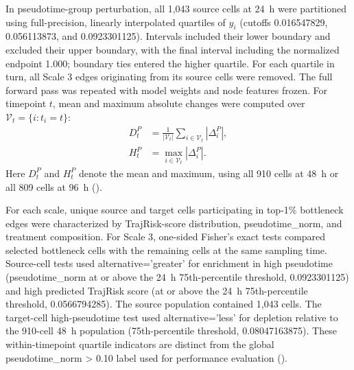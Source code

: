 In pseudotime-group perturbation, all 1,043 source cells at 24~h were partitioned using full-precision, linearly interpolated quartiles of \(y_i\) (cutoffs 0.016547829, 0.056113873, and 0.0923301125). Intervals included their lower boundary and excluded their upper boundary, with the final interval including the normalized endpoint 1.000; boundary ties entered the higher quartile. For each quartile in turn, all Scale 3 edges originating from its source cells were removed. The full forward pass was repeated with model weights and node features frozen. For timepoint \(t\), mean and maximum absolute changes were computed over \(\mathcal V_t=\{i:t_i=t\}\):
\begin{equation}\label{eq:perturbation-summary}
\begin{aligned}
D_t^{P}&=\frac{1}{|\mathcal V_t|}\sum_{i\in\mathcal V_t}|\Delta_i^{P}|,\\
H_t^{P}&=\max_{i\in\mathcal V_t}|\Delta_i^{P}|.
\end{aligned}
\end{equation}
Here \(D_t^{P}\) and \(H_t^{P}\) denote the mean and maximum, using all 910 cells at 48~h or all 809 cells at 96~h ().

For each scale, unique source and target cells participating in top-1\% bottleneck edges were characterized by TrajRisk-score distribution, pseudotime\_norm, and treatment composition. For Scale 3, one-sided Fisher's exact tests compared selected bottleneck cells with the remaining cells at the same sampling time. Source-cell tests used alternative='greater' for enrichment in high pseudotime (pseudotime\_norm at or above the 24~h 75th-percentile threshold, 0.0923301125) and high predicted TrajRisk score (at or above the 24~h 75th-percentile threshold, 0.0566794285). The source population contained 1,043 cells. The target-cell high-pseudotime test used alternative='less' for depletion relative to the 910-cell 48~h population (75th-percentile threshold, 0.08047163875). These within-timepoint quartile indicators are distinct from the global pseudotime\_norm > 0.10 label used for performance evaluation ().

